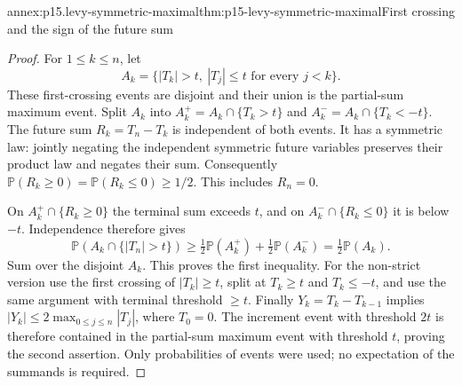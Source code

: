 \begin{annexitem}{annex:p15.levy-symmetric-maximal}{thm:p15-levy-symmetric-maximal}{First crossing and the sign of the future sum}
\begin{proof}
For \(1\leq k\leq n\), let
\[
 A_k=\{|T_k|>t,\ |T_j|\leq t\text{ for every }j<k\}.
\]
These first-crossing events are disjoint and their union is the
partial-sum maximum event. Split \(A_k\) into
\(A_k^+=A_k\cap\{T_k>t\}\) and
\(A_k^-=A_k\cap\{T_k<-t\}\).
The future sum \(R_k=T_n-T_k\) is independent of both events.
It has a symmetric law: jointly negating the independent symmetric
future variables preserves their product law and negates their sum.
Consequently \(\mathbb P(R_k\geq0)=\mathbb P(R_k\leq0)\geq1/2\).
This includes \(R_n=0\).

On \(A_k^+\cap\{R_k\geq0\}\) the terminal sum exceeds \(t\),
and on \(A_k^-\cap\{R_k\leq0\}\) it is below \(-t\).
Independence therefore gives
\[
 \mathbb P(A_k\cap\{|T_n|>t\})
       \geq\tfrac12\mathbb P(A_k^+)+\tfrac12\mathbb P(A_k^-)
       =\tfrac12\mathbb P(A_k).
\]
Sum over the disjoint \(A_k\). This proves the first inequality.
For the non-strict version use the first crossing of \(|T_k|\geq t\),
split at \(T_k\geq t\) and \(T_k\leq-t\), and use the same
argument with terminal threshold \(\geq t\).
Finally \(Y_k=T_k-T_{k-1}\) implies
\(|Y_k|\leq2\max_{0\leq j\leq n}|T_j|\), where \(T_0=0\).
The increment event with threshold \(2t\) is therefore contained
in the partial-sum maximum event with threshold \(t\), proving
the second assertion. Only probabilities of events were used;
no expectation of the summands is required.
\end{proof}
\end{annexitem}

